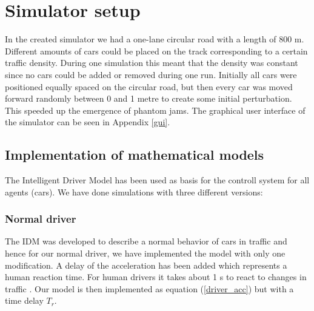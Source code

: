 \section{Simulator setup}
In the created simulator we had a one-lane circular road with a length of
800 m. Different amounts of cars could be placed on the track corresponding to
a certain traffic density. During one simulation this meant that the density
was constant since no cars could be added or removed during one run. Initially
all cars were positioned equally spaced on the circular road, but then every car
was moved forward randomly between 0 and 1 metre to create some initial
perturbation. This speeded up the emergence of phantom jams. The graphical user
interface of the simulator can be seen in Appendix \ref{gui}.

\subsection{Implementation of mathematical models}
The Intelligent Driver Model has been used as basis for the controll system
for all agents (cars). We have done simulations with three different versions:

\begin{comment}
The three systems described in Sections (FIXME: ref till dessa tre modeller)
were implemented as described below. Since the simulator used a circular road
position of the car was transformed into an angle from 0 to 2\begin{math}\pi
\end{math} but since the acceleration and velocity were not affected by this,
the car was only aware of a straight road where the car going out in one
end started over from the other end.
\end{comment}

\subsubsection {Normal driver}
The IDM was developed to describe a normal behavior of cars in traffic
and hence for our normal driver, we have implemented the model with only one
modification. A delay of the acceleration has been added which represents a
human reaction time. For human drivers it takes about 1 s to react to changes in
traffic \cite{idm}. Our model is then implemented as equation (\ref{driver_acc})
but with a time delay \begin{math}T_r\end{math}.

